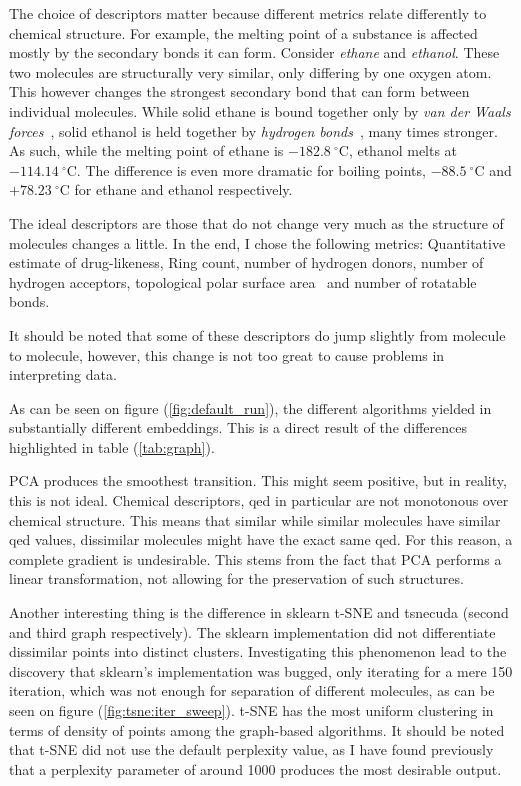The choice of descriptors matter because different metrics relate differently to chemical structure. For example, the melting point of a substance is affected mostly by the secondary bonds it can form. Consider \textit{ethane} and \textit{ethanol}. These two molecules are structurally very similar, only differing by one oxygen atom. This however changes the strongest secondary bond that can form between individual molecules. While solid ethane is bound together only by \textit{van der Waals forces}~\cite{bib:vanderwaals}, solid ethanol is held together by \textit{hydrogen bonds}~\cite{bib:hbond}, many times stronger. As such, while the melting point of ethane is $-182.8~^\circ$C, ethanol melts at $-114.14~^\circ$C. The difference is even more dramatic for boiling points, $-88.5~^\circ$C and $+78.23~^\circ$C for ethane and ethanol respectively.

The ideal descriptors are those that do not change very much as the structure of molecules changes a little. In the end, I chose the following metrics: Quantitative estimate of drug-likeness, Ring count, number of hydrogen donors, number of hydrogen acceptors, topological polar surface area~\cite{bib:tpsa} and number of rotatable bonds.

It should be noted that some of these descriptors do jump slightly from molecule to molecule, however, this change is not too great to cause problems in interpreting data.


As can be seen on figure (\ref{fig:default_run}), the different algorithms yielded in substantially different embeddings. This is a direct result of the differences highlighted in table (\ref{tab:graph}). 

PCA produces the smoothest transition. This might seem positive, but in reality, this is not ideal. Chemical descriptors, qed in particular are not monotonous over chemical structure. This means that similar while similar molecules have similar qed values, dissimilar molecules might have the exact same qed. For this reason, a complete gradient is undesirable. This stems from the fact that PCA performs a linear transformation, not allowing for the preservation of such structures.

Another interesting thing is the difference in sklearn t-SNE and tsnecuda (second and third graph respectively). The sklearn implementation did not differentiate dissimilar points into distinct clusters. Investigating this phenomenon lead to the discovery that sklearn's implementation was bugged, only iterating for a mere 150 iteration, which was not enough for separation of different molecules, as can be seen on figure (\ref{fig:tsne:iter_sweep}). t-SNE has the most uniform clustering in terms of density of points among the graph-based algorithms. It should be noted that t-SNE did not use the default perplexity value, as I have found previously that a perplexity parameter of around 1000 produces the most desirable output. 

